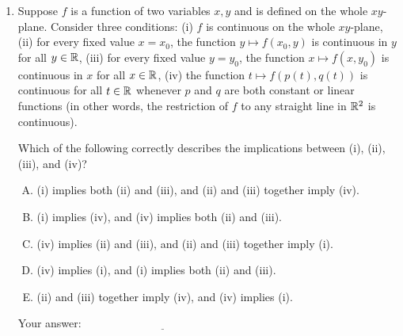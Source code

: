 \documentclass[10pt]{amsart}
\begin{document}
\begin{enumerate}
\item Suppose $f$ is a function of two variables $x,y$ and is defined
  on the whole $xy$-plane. Consider three conditions: (i) $f$ is
  continuous on the whole $xy$-plane, (ii) for every fixed value $x =
  x_0$, the function $y \mapsto f(x_0,y)$ is continuous in $y$ for all
  $y \in \mathbb{R}$, (iii) for every fixed value $y = y_0$, the function $x
  \mapsto f(x,y_0)$ is continuous in $x$ for all $x \in \mathbb{R}$, (iv) the
  function $t \mapsto f(p(t),q(t))$ is continuous for all $t \in \mathbb{R}$
  whenever $p$ and $q$ are both constant or linear functions (in other
  words, the restriction of $f$ to any straight line in $\mathbb{R}^2$ is
  continuous).

  Which of the following correctly describes the implications between
  (i), (ii), (iii), and (iv)?

  \begin{enumerate}[(A)]
  \item (i) implies both (ii) and (iii), and (ii) and (iii) together imply (iv).
  \item (i) implies (iv), and (iv) implies both (ii) and (iii).
  \item (iv) implies (ii) and (iii), and (ii) and (iii) together imply (i).
  \item (iv) implies (i), and (i) implies both (ii) and (iii).
  \item (ii) and (iii) together imply (iv), and (iv) implies (i).
  \end{enumerate}
  
  \vspace{0.1in}
  Your answer: $\underline{\qquad\qquad\qquad\qquad\qquad\qquad\qquad}$
  \vspace{0.1in}

\end{enumerate}
\end{document}

